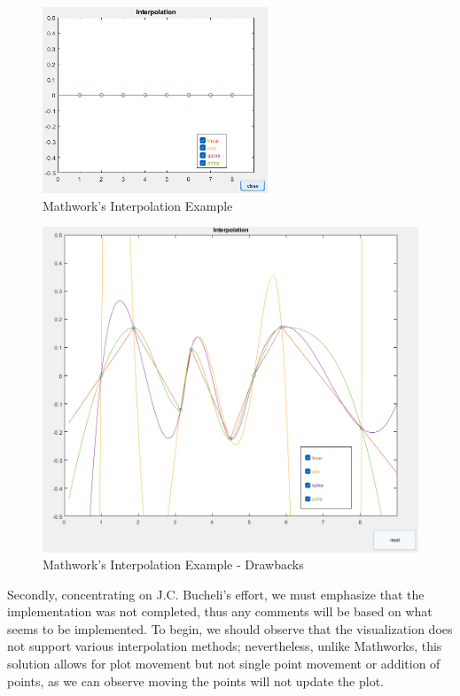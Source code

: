 \begin{figure}[H]
    \centering
    \includegraphics[width=0.6\textwidth]{Include/Images/Thesis/Development/Visualizers/INTERPOLATION VISUALIZER/Mathworks.Interpolation.Ex1.png}
    \caption{Mathwork's \cite{doi:10.1137/1.9780898717952} Interpolation Example}
    \label{fig:Mathworks Interpolation Example}
\end{figure}
\begin{figure}[H]
    \centering
    \includegraphics[width=\textwidth]{Include/Images/Thesis/Development/Visualizers/INTERPOLATION VISUALIZER/Mathworks.Interpolation.Ex1.1.png}
    \caption{Mathwork's \cite{doi:10.1137/1.9780898717952} Interpolation Example - Drawbacks}
    \label{fig:Mathwork's Interpolation Example - Drawbacks}
\end{figure}


Secondly, concentrating on J.C. Bucheli's effort, we must emphasize that the implementation was not completed, thus any comments will be based on what seems to be implemented. To begin, we should observe that the visualization does not support various interpolation methods; nevertheless, unlike Mathworks, this solution allows for plot movement but not single point movement or addition of points, as we can observe  moving the points will not update the plot.

